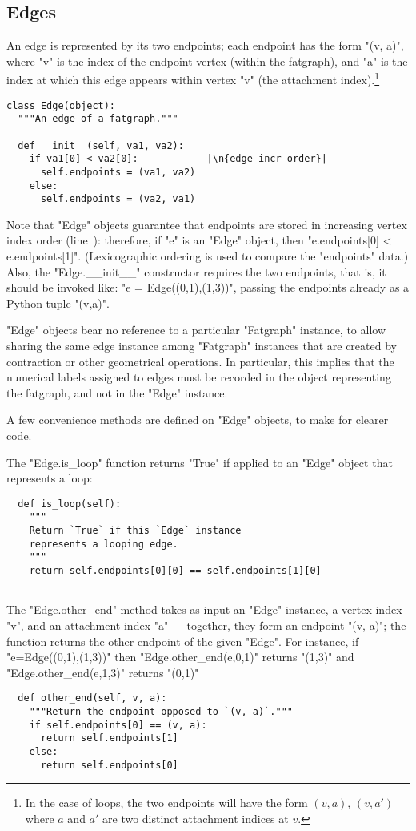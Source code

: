\subsection{Edges}
\label{sec:edges}

An edge is represented by its two endpoints; each endpoint has the
form "(v, a)", where "v" is the index of the endpoint vertex
(within the fatgraph), and "a" is the index at which this edge
appears within vertex "v" (the attachment index).\footnote{In the case
  of loops, the two endpoints will have the form $(v,a)$, $(v,a')$
  where $a$ and $a'$ are two distinct attachment indices at $v$.}
\begin{lstlisting}
class Edge(object):
  """An edge of a fatgraph."""

  def __init__(self, va1, va2):
    if va1[0] < va2[0]:            |\n{edge-incr-order}|
      self.endpoints = (va1, va2)
    else:
      self.endpoints = (va2, va1)

\end{lstlisting}
Note that "Edge" objects guarantee that endpoints are stored in
increasing vertex index order (line~): therefore,
if "e" is an "Edge" object, then "e.endpoints[0] < e.endpoints[1]".
(Lexicographic ordering is used to compare the "endpoints" data.)
Also, the "Edge.__init__" constructor requires the two endpoints, that
is, it should be invoked like: "e = Edge((0,1),(1,3))", passing the
endpoints already as a Python tuple "(v,a)".

"Edge" objects bear no reference to a particular "Fatgraph" instance,
to allow sharing the same edge instance among "Fatgraph" instances that are
created by contraction or other geometrical operations.  In
particular, this implies that the numerical labels assigned to
edges must be recorded in the object representing the fatgraph, and
not in the "Edge" instance.

A few convenience methods are defined on "Edge" objects, to make for
clearer code.

The "Edge.is_loop" function returns "True" if applied to an
"Edge" object that represents a loop:
\begin{lstlisting}
  def is_loop(self):
    """
    Return `True` if this `Edge` instance 
    represents a looping edge.
    """
    return self.endpoints[0][0] == self.endpoints[1][0]
    
\end{lstlisting}

The "Edge.other_end" method takes as input an "Edge" instance, a
vertex index "v", and an attachment index "a" --- together, they
form an endpoint "(v, a)"; the function returns the other endpoint
of the given "Edge".  For instance, if "e=Edge((0,1),(1,3))"
then "Edge.other_end(e,0,1)" returns "(1,3)" and
"Edge.other_end(e,1,3)" returns "(0,1)"
\begin{lstlisting}
  def other_end(self, v, a):
    """Return the endpoint opposed to `(v, a)`."""
    if self.endpoints[0] == (v, a):
      return self.endpoints[1]
    else:
      return self.endpoints[0]

\end{lstlisting}


